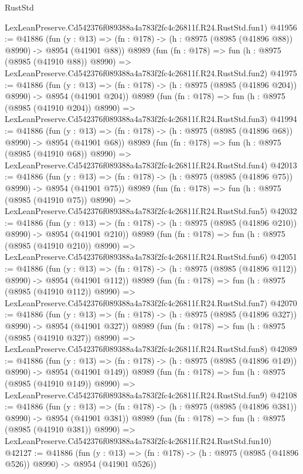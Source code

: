 \begin{lexlean}{RustStd}
\begin{coremodule}
    LexLeanPreserve.Cd542376f089388a4a783f2fc4c26811f.R24.RustStd.fun1)
@41956 := @41886
    (fun (y : @13) => (fn : @178) -> (h : @8975 (@8985 (@41896 @88)) @8990) -> @8954 (@41901 @88))
    @8989
    (fun (fn : @178) =>
    fun (h : @8975 (@8985 (@41910 @88)) @8990) =>
    LexLeanPreserve.Cd542376f089388a4a783f2fc4c26811f.R24.RustStd.fun2)
@41975 := @41886
    (fun (y : @13) => (fn : @178) -> (h : @8975 (@8985 (@41896 @204)) @8990) -> @8954 (@41901 @204))
    @8989
    (fun (fn : @178) =>
    fun (h : @8975 (@8985 (@41910 @204)) @8990) =>
    LexLeanPreserve.Cd542376f089388a4a783f2fc4c26811f.R24.RustStd.fun3)
@41994 := @41886
    (fun (y : @13) => (fn : @178) -> (h : @8975 (@8985 (@41896 @68)) @8990) -> @8954 (@41901 @68))
    @8989
    (fun (fn : @178) =>
    fun (h : @8975 (@8985 (@41910 @68)) @8990) =>
    LexLeanPreserve.Cd542376f089388a4a783f2fc4c26811f.R24.RustStd.fun4)
@42013 := @41886
    (fun (y : @13) => (fn : @178) -> (h : @8975 (@8985 (@41896 @75)) @8990) -> @8954 (@41901 @75))
    @8989
    (fun (fn : @178) =>
    fun (h : @8975 (@8985 (@41910 @75)) @8990) =>
    LexLeanPreserve.Cd542376f089388a4a783f2fc4c26811f.R24.RustStd.fun5)
@42032 := @41886
    (fun (y : @13) => (fn : @178) -> (h : @8975 (@8985 (@41896 @210)) @8990) -> @8954 (@41901 @210))
    @8989
    (fun (fn : @178) =>
    fun (h : @8975 (@8985 (@41910 @210)) @8990) =>
    LexLeanPreserve.Cd542376f089388a4a783f2fc4c26811f.R24.RustStd.fun6)
@42051 := @41886
    (fun (y : @13) => (fn : @178) -> (h : @8975 (@8985 (@41896 @112)) @8990) -> @8954 (@41901 @112))
    @8989
    (fun (fn : @178) =>
    fun (h : @8975 (@8985 (@41910 @112)) @8990) =>
    LexLeanPreserve.Cd542376f089388a4a783f2fc4c26811f.R24.RustStd.fun7)
@42070 := @41886
    (fun (y : @13) => (fn : @178) -> (h : @8975 (@8985 (@41896 @327)) @8990) -> @8954 (@41901 @327))
    @8989
    (fun (fn : @178) =>
    fun (h : @8975 (@8985 (@41910 @327)) @8990) =>
    LexLeanPreserve.Cd542376f089388a4a783f2fc4c26811f.R24.RustStd.fun8)
@42089 := @41886
    (fun (y : @13) => (fn : @178) -> (h : @8975 (@8985 (@41896 @149)) @8990) -> @8954 (@41901 @149))
    @8989
    (fun (fn : @178) =>
    fun (h : @8975 (@8985 (@41910 @149)) @8990) =>
    LexLeanPreserve.Cd542376f089388a4a783f2fc4c26811f.R24.RustStd.fun9)
@42108 := @41886
    (fun (y : @13) => (fn : @178) -> (h : @8975 (@8985 (@41896 @381)) @8990) -> @8954 (@41901 @381))
    @8989
    (fun (fn : @178) =>
    fun (h : @8975 (@8985 (@41910 @381)) @8990) =>
    LexLeanPreserve.Cd542376f089388a4a783f2fc4c26811f.R24.RustStd.fun10)
@42127 := @41886
    (fun (y : @13) => (fn : @178) -> (h : @8975 (@8985 (@41896 @526)) @8990) -> @8954 (@41901 @526))

\end{coremodule}
\end{lexlean}
